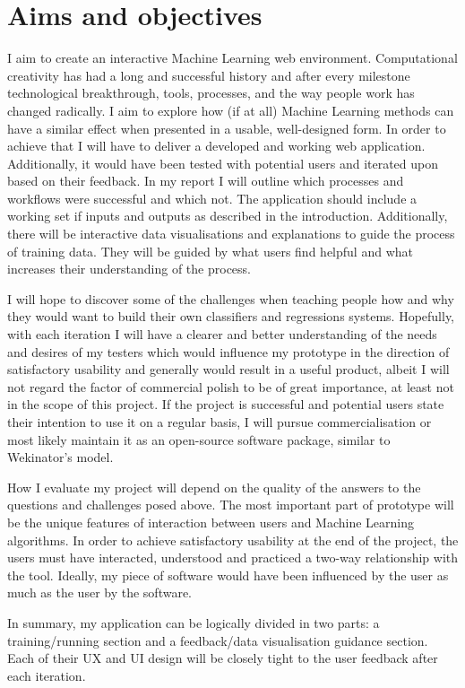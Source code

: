 \documentclass[a4paper, 11pt]{article}
\begin{document}
  \section{Aims and objectives}
  I aim to create an interactive Machine Learning web environment. Computational creativity has had a long and successful history and after every milestone technological breakthrough, tools, processes, and the way people work has changed radically. I aim to explore how (if at all) Machine Learning methods can have a similar effect when presented in a usable, well-designed form. In order to achieve that I will have to deliver a developed and working web application. Additionally, it would have been tested with potential users and iterated upon based on their feedback. In my report I will outline which processes and workflows were successful and which not. The application should include a working set if inputs and outputs as described in the introduction. Additionally, there will be interactive data visualisations and explanations to guide the process of training data. They will be guided by what users find helpful and what increases their understanding of the process.

  I will hope to discover some of the challenges when teaching people how and why they would want to build their own classifiers and regressions systems. Hopefully, with each iteration I will have a clearer and better understanding of the needs and desires of my testers which would influence my prototype in the direction of satisfactory usability and generally would result in a useful product, albeit I will not regard the factor of commercial polish to be of great importance, at least not in the scope of this project. If the project is successful and potential users state their intention to use it on a regular basis, I will pursue commercialisation or most likely maintain it as an open-source software package, similar to Wekinator's model.

  How I evaluate my project will depend on the quality of the answers to the questions and challenges posed above. The most important part of prototype will be the unique features of interaction between users and Machine Learning algorithms. In order to achieve satisfactory usability at the end of the project, the users must have interacted, understood and practiced a two-way relationship with the tool. Ideally, my piece of software would have been influenced by the user as much as the user by the software.

  In summary, my application can be logically divided in two parts: a training/running section and a feedback/data visualisation guidance section. Each of their UX and UI design will be closely tight to the user feedback after each iteration.
\end{document}
